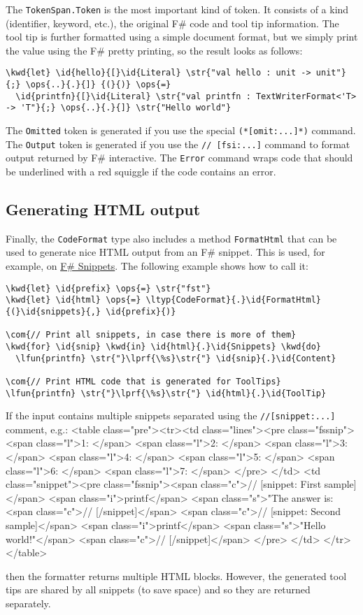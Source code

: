 \documentclass{article}
\newcommand{\id}[1]{\textcolor{black}{#1}}
\newcommand{\com}[1]{\textcolor{officegreen}{#1}}
\newcommand{\kwd}[1]{\textcolor{navy}{#1}}
\newcommand{\ops}[1]{\textcolor{purple}{#1}}
\newcommand{\str}[1]{\textcolor{olive}{#1}}
\begin{document}
The \texttt{TokenSpan.Token} is the most important kind of token. It consists of a kind
(identifier, keyword, etc.), the original F\# code and tool tip information.
The tool tip is further formatted using a simple document format, but we simply
print the value using the F\# pretty printing, so the result looks as follows:
\begin{Verbatim}[commandchars=\\\{\}]
\kwd{let} \id{hello}{[}\id{Literal} \str{"val hello : unit -> unit"}{;} \ops{..}{.}{]} {(}{)} \ops{=} 
  \id{printfn}{[}\id{Literal} \str{"val printfn : TextWriterFormat<'T> -> 'T"}{;} \ops{..}{.}{]} \str{"Hello world"}

\end{Verbatim}



The \texttt{Omitted} token is generated if you use the special \texttt{(*[omit:...]*)} command.
The \texttt{Output} token is generated if you use the \texttt{// [fsi:...]} command to format
output returned by F\# interactive. The \texttt{Error} command wraps code that should be
underlined with a red squiggle if the code contains an error.
\subsection*{Generating HTML output}



Finally, the \texttt{CodeFormat} type also includes a method \texttt{FormatHtml} that can be used
to generate nice HTML output from an F\# snippet. This is used, for example, on
\href{http://www.fssnip.net}{F\# Snippets}. The following example shows how to call it:
\begin{Verbatim}[commandchars=\\\{\}]
\kwd{let} \id{prefix} \ops{=} \str{"fst"} 
\kwd{let} \id{html} \ops{=} \ltyp{CodeFormat}{.}\id{FormatHtml}{(}\id{snippets}{,} \id{prefix}{)}

\com{// Print all snippets, in case there is more of them}
\kwd{for} \id{snip} \kwd{in} \id{html}{.}\id{Snippets} \kwd{do}
  \lfun{printfn} \str{"}\lprf{\%s}\str{"} \id{snip}{.}\id{Content}

\com{// Print HTML code that is generated for ToolTips}
\lfun{printfn} \str{"}\lprf{\%s}\str{"} \id{html}{.}\id{ToolTip}
\end{Verbatim}



If the input contains multiple snippets separated using the \texttt{//[snippet:...]} comment, e.g.:
<table class="pre"><tr><td class="lines"><pre class="fssnip">
<span class="l">1: </span>
<span class="l">2: </span>
<span class="l">3: </span>
<span class="l">4: </span>
<span class="l">5: </span>
<span class="l">6: </span>
<span class="l">7: </span>
</pre>
</td>
<td class="snippet"><pre class="fssnip"><span class="c">// [snippet: First sample]</span>
<span class="i">printf</span> <span class="s">"The answer is: %
<span class="c">// [/snippet]</span>
<span class="c">// [snippet: Second sample]</span>
<span class="i">printf</span> <span class="s">"Hello world!"</span>
<span class="c">// [/snippet]</span>
</pre>
</td>
</tr>
</table>


then the formatter returns multiple HTML blocks. However, the generated tool tips
are shared by all snippets (to save space) and so they are returned separately.
\end{document}
